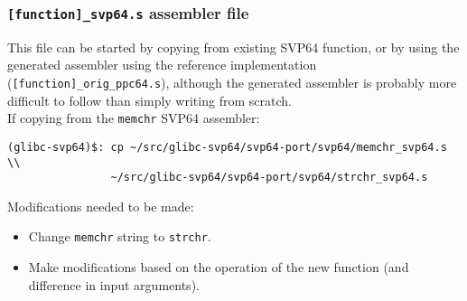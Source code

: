 \subsubsection{\texttt{[function]\_svp64.s} assembler file}

This file can be started by copying from existing SVP64 function, or by using
the generated assembler using the reference implementation
(\texttt{[function]\_orig\_ppc64.s}), although the generated assembler is
probably more difficult to follow than simply writing from scratch.\\

If copying from the \texttt{memchr} SVP64 assembler:
\begin{verbatim}
(glibc-svp64)$: cp ~/src/glibc-svp64/svp64-port/svp64/memchr_svp64.s \\
                ~/src/glibc-svp64/svp64-port/svp64/strchr_svp64.s
\end{verbatim}

Modifications needed to be made:
\begin{itemize}
  \item Change \texttt{memchr} string to \texttt{strchr}.
  \item Make modifications based on the operation of the new function
  (and difference in input arguments).
\end{itemize}
